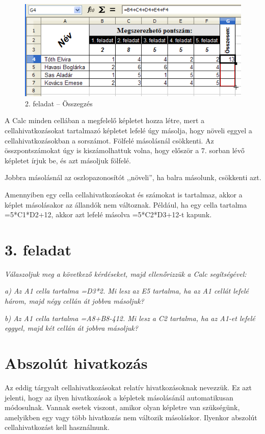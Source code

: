 \begin{figure}[!h]
\begin{center}
\includegraphics[width=12.122cm]{oocalcv1-img24.png}
\caption{2.  feladat --  Összegzés}\label{2-feladatÖsszegzés}
\end{center}
\end{figure}

A Calc minden cellában a megfelelő képletet hozza létre, mert
a cellahivatkozásokat tartalmazó képletet lefelé úgy
másolja, hogy növeli eggyel a cellahivatkozásokban a sorszámot.
Fölfelé másolásnál csökkenti. Az összpontszámokat úgy
is kiszámolhattuk volna, hogy először a 7. sorban lévő
képletet írjuk be, és azt másoljuk fölfelé.

Jobbra másolásnál az oszlopazonosítót ,,növeli'', ha balra másolunk,
csökkenti azt.

Amennyiben egy cella cellahivatkozásokat és számokat is tartalmaz,
akkor a képlet másolásakor az állandók nem változnak.
Például, ha egy cella tartalma =5*C1*D2+12, akkor azt lefelé
másolva   =5*C2*D3+12-t kapunk.

\clearpage
\section{3. feladat}
{\itshape
Válaszoljuk meg a következő kérdéseket, majd
ellenőrizzük a Calc segítségével:}

{\itshape
a) Az A1 cella tartalma =D3*2. Mi lesz az E5 tartalma, ha az A1 cellát
lefelé három, majd négy cellán át jobbra másoljuk?}

{\itshape
b) Az A1 cella tartalma =A8+B8-412. Mi lesz a C2 tartalma, ha az A1-et
lefelé eggyel, majd két cellán át jobbra másoljuk?}


\section{Abszolút hivatkozás}

Az eddig tárgyalt cellahivatkozásokat relatív hivatkozásoknak
nevezzük. Ez azt jelenti, hogy az ilyen hivatkozások a képletek
másolásánál automatikusan módosulnak. Vannak esetek viszont,
amikor olyan képletre van szükségünk, amelyikben egy vagy
több hivatkozás nem változik másoláskor. Ilyenkor abszolút
cellahivatkozást kell használnunk.

